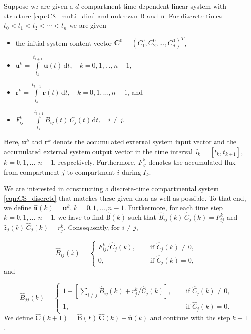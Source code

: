 \documentclass[draft]{agujournal2019}
\renewcommand{\vec}[1]{\mathbf{#1}}
\newcommand{\tens}[1]{\mathrm{#1}}
\newcommand{\dd}[1]{\,\mathrm{d}#1}
\newcommand{\intl}{\int\limits}
\newcommand{\suml}{\sum\limits}
\begin{document}
    Suppose we are given a $d$-compartment time-dependent linear system with structure \eqref{eqn:CS_multi_dim} and unknown $\tens{B}$ and $\vec{u}$.
    For discrete times $t_0<t_1<t_2<\cdots<t_n$ we are given
     \begin{itemize} 
        \item the initial system content vector $\vec{C}^0=(C^0_1,C^0_2,\ldots,C^0_d)^T$,
        \item $\vec{u}^k = \intl_{t_k}^{t_{k+1}} \vec{u}(t)\dd{t},\quad k=0,1,\ldots,n-1$, 
        \item $\vec{r}^k = \intl_{t_k}^{t_{k+1}} \vec{r}(t)\dd{t},\quad k=0,1,\ldots,n-1$, and
        \item $F_{ij}^k = \intl_{t_k}^{t_{k+1}} B_{ij}(t)\,C_j(t)\dd{t},\quad i\neq j$.
     \end{itemize} 
    Here, $\vec{u}^k$ and $\vec{r}^k$ denote the accumulated external system input vector and the accumulated external system output vector in the time interval $I_k=[t_k,t_{k+1}]$, $k=0,1,\ldots,n-1$, respectively.
    Furthermore, $F^k_{ij}$ denotes the accumulated flux from compartment $j$ to compartment $i$ during $I_k$.

    We are interested in constructing a discrete-time compartmental system \eqref{eqn:CS_discrete} that matches these given data as well as possible.
    To that end, we define $\widehat{\vec{u}}(k)=\vec{u}^k$, $k=0,1,\ldots,n-1$.
    Furthermore, for each time step $k=0,1,\ldots,n-1$, we have to find $\widehat{\tens{B}}(k)$ such that $\widehat{B}_{ij}(k)\,\widehat{C}_j(k)=F^k_{ij}$ and $\widehat{z}_j(k)\,\widehat{C}_j(k)=r^k_j$.
    Consequently, for $i\neq j$,

    \begin{equation*}
        \widehat{B}_{ij}(k) =
        \begin{cases}
            F^k_{ij} / \widehat{C}_j(k),\quad&\text{ if }\widehat{C}_j(k)\neq0,\\
            0, &\text{ if }\widehat{C}_j(k)=0,
        \end{cases}
    \end{equation*}
    and

    \begin{equation*}
        \widehat{B}_{jj}(k) = 
        \begin{cases}
            1-\left[\suml_{i\neq j}\widehat{B}_{ij}(k)+r^k_j/\widehat{C}_j(k)\right],\quad &\text{ if }\widehat{C}_j(k)\neq0,\\
            1, &\text{ if }\widehat{C}_j(k)=0.
        \end{cases}
    \end{equation*}
    We define $\widehat{\vec{C}}(k+1)=\widehat{\tens{B}}(k)\,\widehat{\vec{C}}(k)+\widehat{\vec{u}}(k)$ and continue with the step $k+1$.
\end{document}
